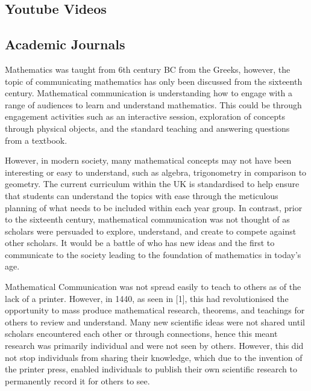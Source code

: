\documentclass[12pt, a4paper,oneside]{book}
\numberwithin{equation}{section}
\begin{document}
\subsection{Youtube Videos}











\subsection{Academic Journals}
Mathematics was taught from 6th century BC from the Greeks, however, the topic of communicating mathematics has only been discussed from the sixteenth century. Mathematical communication is understanding how to engage with a range of audiences to learn and understand mathematics. This could be through engagement activities such as an interactive session, exploration of concepts through physical objects, and the standard teaching and answering questions from a textbook.

However, in modern society, many mathematical concepts may not have been interesting or easy to understand, such as algebra, trigonometry in comparison to geometry. The current curriculum within the UK is standardised to help ensure that students can understand the topics with ease through the meticulous planning of what needs to be included within each year group. In contrast, prior to the sixteenth century, mathematical communication was not thought of as scholars were persuaded to explore, understand, and create to compete against other scholars. It would be a battle of who has new ideas and the first to communicate to the society leading to the foundation of mathematics in today’s age.

Mathematical Communication was not spread easily to teach to others as of the lack of a printer. However, in 1440, as seen in [1], this had revolutionised the opportunity to mass produce mathematical research, theorems, and teachings for others to review and understand. Many new scientific ideas were not shared until scholars encountered each other or through connections, hence this meant research was primarily individual and were not seen by others. However, this did not stop individuals from sharing their knowledge, which due to the invention of the printer press, enabled individuals to publish their own scientific research to permanently record it for others to see.
\end{document}
